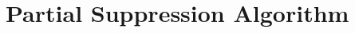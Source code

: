  \section{Partial Suppression Algorithm}
\label{sec:algo}

\renewcommand{\algorithmicforall}{\textbf{for each}}




